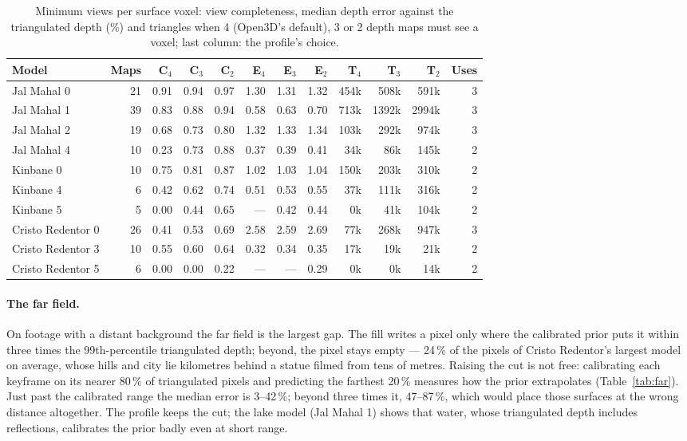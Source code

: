 \begin{table}[htbp]
\centering\small
\caption{Minimum views per surface voxel: view completeness, median depth error against the triangulated depth (\%) and triangles when 4 (Open3D's default), 3 or 2 depth maps must see a voxel; last column: the profile's choice.}\label{tab:views}
\begin{adjustbox}{max width=\linewidth}
\begin{tabular}{lrrrrrrrrrrr}
\toprule
Model & Maps & C$_4$ & C$_3$ & C$_2$ & E$_4$ & E$_3$ & E$_2$ & T$_4$ & T$_3$ & T$_2$ & Uses \\
\midrule
Jal Mahal 0 & 21 & 0.91 & 0.94 & 0.97 & 1.30 & 1.31 & 1.32 & 454k & 508k & 591k & 3 \\
Jal Mahal 1 & 39 & 0.83 & 0.88 & 0.94 & 0.58 & 0.63 & 0.70 & 713k & 1392k & 2994k & 3 \\
Jal Mahal 2 & 19 & 0.68 & 0.73 & 0.80 & 1.32 & 1.33 & 1.34 & 103k & 292k & 974k & 3 \\
Jal Mahal 4 & 10 & 0.23 & 0.73 & 0.88 & 0.37 & 0.39 & 0.41 & 34k & 86k & 145k & 2 \\
Kinbane 0 & 10 & 0.75 & 0.81 & 0.87 & 1.02 & 1.03 & 1.04 & 150k & 203k & 310k & 2 \\
Kinbane 4 & 6 & 0.42 & 0.62 & 0.74 & 0.51 & 0.53 & 0.55 & 37k & 111k & 316k & 2 \\
Kinbane 5 & 5 & 0.00 & 0.44 & 0.65 & --- & 0.42 & 0.44 & 0k & 41k & 104k & 2 \\
Cristo Redentor 0 & 26 & 0.41 & 0.53 & 0.69 & 2.58 & 2.59 & 2.69 & 77k & 268k & 947k & 3 \\
Cristo Redentor 3 & 10 & 0.55 & 0.60 & 0.64 & 0.32 & 0.34 & 0.35 & 17k & 19k & 21k & 2 \\
Cristo Redentor 5 & 6 & 0.00 & 0.00 & 0.22 & --- & --- & 0.29 & 0k & 0k & 14k & 2 \\
\bottomrule
\end{tabular}
\end{adjustbox}
\end{table}

\paragraph{The far field.} On footage with a distant background the far field is the largest gap. The fill writes a pixel only where the calibrated prior puts it within three times the 99th-percentile triangulated depth; beyond, the pixel stays empty --- 24\,\% of the pixels of Cristo Redentor's largest model on average, whose hills and city lie kilometres behind a statue filmed from tens of metres. Raising the cut is not free: calibrating each keyframe on its nearer 80\,\% of triangulated pixels and predicting the farthest 20\,\% measures how the prior extrapolates (Table~\ref{tab:far}). Just past the calibrated range the median error is 3--42\,\%; beyond three times it, 47--87\,\%, which would place those surfaces at the wrong distance altogether. The profile keeps the cut; the lake model (Jal Mahal 1) shows that water, whose triangulated depth includes reflections, calibrates the prior badly even at short range.

